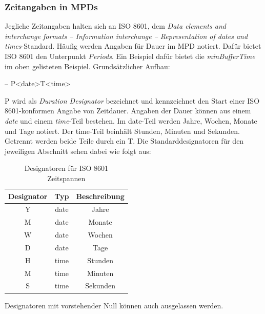 \documentclass[paper = a4, fontsize = 12pt, parskip = half]{scrartcl} %
\begin{document}
\subsubsection{Zeitangaben in MPDs}
\label{iso8601_duration}
Jegliche Zeitangaben halten sich an ISO 8601, dem \textit{Data elements and interchange formats – Information interchange – Representation of dates and times}-Standard. Häufig werden Angaben für Dauer im MPD notiert. Dafür bietet ISO 8601 den Unterpunkt \textit{Periods}. Ein Beispiel dafür bietet die \textit{minBufferTime} im oben gelisteten Beispiel. Grundsätzlicher Aufbau:

-- P<date>T<time>

P wird als \textit{Duration Designator} bezeichnet und kennzeichnet den Start einer ISO 8601-konformen Angabe von Zeitdauer. Angaben der Dauer können aus einem \textit{date} und einem \textit{time}-Teil bestehen. Im date-Teil werden Jahre, Wochen, Monate und Tage notiert. Der time-Teil beinhält Stunden, Minuten und Sekunden. Getrennt werden beide Teile durch ein T. Die Standarddesignatoren für den jeweiligen Abschnitt sehen dabei wie folgt aus:

\begin{center}
    \begin{table}[ht]
        \label{iso_duration_designators}
        \centering
        \begin{tabular}{|c|c|c|}
            \hline
                \textbf{Designator} & \textbf{Typ} & \textbf{Beschreibung} \\
            \hline
            \hline
            Y & date & Jahre \\
            \hline
            M & date & Monate \\
            \hline
            W & date & Wochen \\
            \hline
            D & date & Tage \\
            \hline
            \hline
            H & time & Stunden \\
            \hline
            M & time & Minuten \\
            \hline
            S & time & Sekunden \\
            \hline
        \end{tabular}
        \caption{Designatoren für ISO 8601 Zeitspannen}
    \end{table}
\end{center}
Designatoren mit vorstehender Null können auch ausgelassen werden. 
\end{document}
